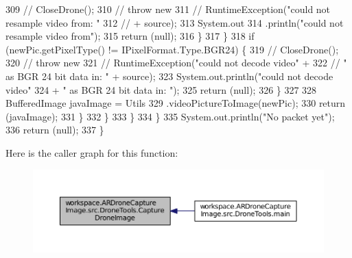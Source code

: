\begin{DoxyCode}
309                                 \textcolor{comment}{// CloseDrone();}
310                                 \textcolor{comment}{// throw new}
311                                 \textcolor{comment}{// RuntimeException("could not resample video from: "}
312                                 \textcolor{comment}{// + source);}
313                                 System.out
314                                         .println(\textcolor{stringliteral}{"could not resample video from"});
315                                 \textcolor{keywordflow}{return} (null);
316                             \}
317                         \}
318                         \textcolor{keywordflow}{if} (newPic.getPixelType() != IPixelFormat.Type.BGR24) \{
319                             \textcolor{comment}{// CloseDrone();}
320                             \textcolor{comment}{// throw new}
321                             \textcolor{comment}{// RuntimeException("could not decode video" +}
322                             \textcolor{comment}{// " as BGR 24 bit data in: " + source);}
323                             System.out.println(\textcolor{stringliteral}{"could not decode video"}
324                                     + \textcolor{stringliteral}{" as BGR 24 bit data in: "});
325                             \textcolor{keywordflow}{return} (null);
326                         \}
327 
328                         BufferedImage javaImage = Utils
329                                 .videoPictureToImage(newPic);
330                         \textcolor{keywordflow}{return} (javaImage);
331                     \}
332                 \}
333             \}
334         \}
335         System.out.println(\textcolor{stringliteral}{"No packet yet"});
336         \textcolor{keywordflow}{return} (null);
337     \}
\end{DoxyCode}


Here is the caller graph for this function\+:\nopagebreak
\begin{figure}[H]
\begin{center}
\leavevmode
\includegraphics[width=350pt]{classworkspace_1_1_a_r_drone_capture_image_1_1src_1_1_drone_tools_a095e49b01ac341b6a4e7b139617ae20e_icgraph}
\end{center}
\end{figure}


